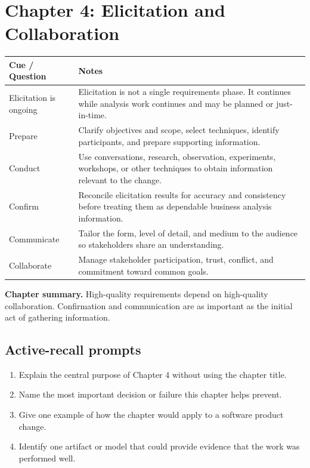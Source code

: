 \documentclass[11pt]{article}
\begin{document}
\section{Chapter 4: Elicitation and Collaboration}
\begin{longtable}{L{0.26\textwidth} L{0.64\textwidth}}
\toprule
\textbf{Cue / Question} & \textbf{Notes}\\
\midrule
\endhead
Elicitation is ongoing & Elicitation is not a single requirements phase. It continues while analysis work continues and may be planned or just-in-time.\\
Prepare & Clarify objectives and scope, select techniques, identify participants, and prepare supporting information.\\
Conduct & Use conversations, research, observation, experiments, workshops, or other techniques to obtain information relevant to the change.\\
Confirm & Reconcile elicitation results for accuracy and consistency before treating them as dependable business analysis information.\\
Communicate & Tailor the form, level of detail, and medium to the audience so stakeholders share an understanding.\\
Collaborate & Manage stakeholder participation, trust, conflict, and commitment toward common goals.\\
\bottomrule
\end{longtable}
\begin{keybox}\textbf{Chapter summary.} High-quality requirements depend on high-quality collaboration. Confirmation and communication are as important as the initial act of gathering information.\end{keybox}
\subsection*{Active-recall prompts}
\begin{enumerate}
\item Explain the central purpose of Chapter 4 without using the chapter title.
\item Name the most important decision or failure this chapter helps prevent.
\item Give one example of how the chapter would apply to a software product change.
\item Identify one artifact or model that could provide evidence that the work was performed well.
\end{enumerate}
\end{document}

